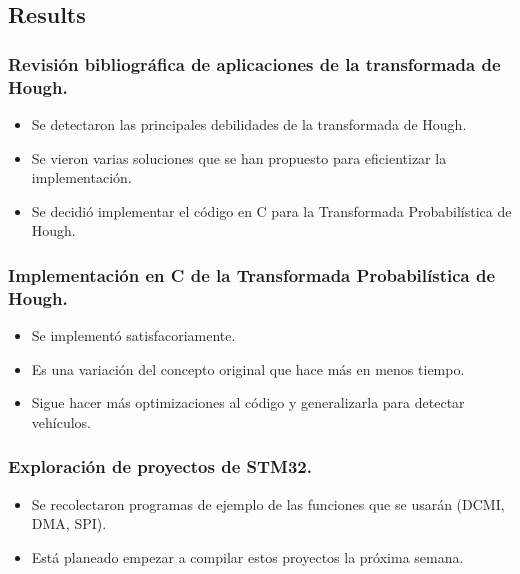 \subsection{Results}


\subsubsection[Revisión bibliográfica transformada de Hough.]{Revisión bibliográfica de aplicaciones de la transformada de Hough.}
\begin{itemize}
	\item Se detectaron las principales debilidades de la transformada de Hough.
	\item Se vieron varias soluciones que se han propuesto para eficientizar la implementación.
	\item Se decidió implementar el código en C para la Transformada Probabilística de Hough.
\end{itemize}


\subsubsection[Código C de la T. Probabilística de Hough]{Implementación en C de la Transformada Probabilística de Hough.}
\begin{itemize}
	\item Se implementó satisfacoriamente.
	\item Es una variación del concepto original que hace más en menos tiempo.
	\item Sigue hacer más optimizaciones al código y generalizarla para detectar vehículos.
\end{itemize}


\subsubsection{Exploración de proyectos de STM32.}
\begin{itemize}
	\item Se recolectaron programas de ejemplo de las funciones que se usarán (DCMI, DMA, SPI).
	\item Está planeado empezar a compilar estos proyectos la próxima semana.
\end{itemize}

